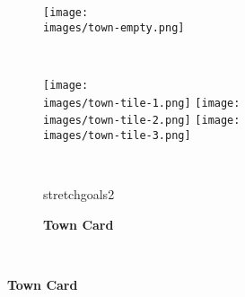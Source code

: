 \begin{figure}[H]
  \centering
  \begin{subfigure}[c]{0.3\linewidth}
    \texttt{[image: \\images/town-empty.png]}
    \caption{\textbf{}}
  \end{subfigure}
  ~
  \begin{subfigure}[c]{0.3\linewidth}
    \centering
    \texttt{[image: \\images/town-tile-1.png]}
    \texttt{[image: \\images/town-tile-2.png]}
    \texttt{[image: \\images/town-tile-3.png]}
    \caption{\textbf{}}
  \end{subfigure}
  ~
  \begin{subfigure}[c]{0.22\linewidth}
    \begin{expansionmini}{stretchgoals2}
      \centering
      \caption{\textbf{Town Card}}
    \end{expansionmini}
  \end{subfigure}
  ~
\end{figure}

